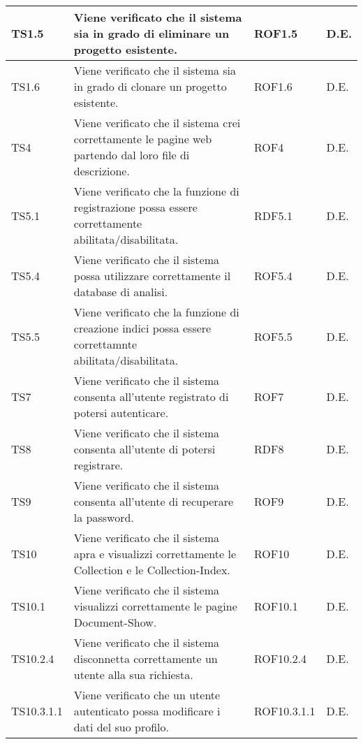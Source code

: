 \begin{center}
\begin{longtable}{|p{2cm}|p{7cm}|p{2cm}|p{2cm}|}
\midrule
TS1.5
& Viene verificato che il sistema sia in grado di eliminare un progetto esistente.
& ROF1.5
& D.E.\\


\midrule
TS1.6
& Viene verificato che il sistema sia in grado di clonare un progetto esistente.
& ROF1.6
& D.E.\\


\midrule
TS4
& Viene verificato che il sistema crei correttamente le pagine web partendo dal loro file di descrizione.
& ROF4
& D.E.\\


\midrule
TS5.1
& Viene verificato che la funzione di registrazione possa essere correttamente abilitata/disabilitata.
& RDF5.1
& D.E.\\


\midrule
TS5.4
& Viene verificato che il sistema possa utilizzare correttamente il database di analisi.
& ROF5.4
& D.E.\\


\midrule
TS5.5
& Viene verificato che la funzione di creazione indici possa essere correttamnte abilitata/disabilitata.
& ROF5.5
& D.E.\\


\midrule
TS7
& Viene verificato che il sistema consenta all'utente registrato di potersi autenticare.
& ROF7
& D.E.\\


\midrule
TS8
& Viene verificato che il sistema consenta all'utente di potersi registrare.
& RDF8
& D.E.\\


\midrule
TS9
& Viene verificato che il sistema consenta all'utente di recuperare la password.
& ROF9
& D.E.\\


\midrule
TS10
& Viene verificato che il sistema apra e visualizzi correttamente le Collection e le Collection-Index.
& ROF10
& D.E.\\


\midrule
TS10.1
& Viene verificato che il sistema visualizzi correttamente le pagine Document-Show.
& ROF10.1
& D.E.\\


\midrule
TS10.2.4
& Viene verificato che il sistema disconnetta correttamente un utente alla sua richiesta.
& ROF10.2.4
& D.E.\\


\midrule
TS10.3.1.1
& Viene verificato che un utente autenticato possa modificare i dati del suo profilo.
& ROF10.3.1.1
& D.E.\\



\end{longtable}
\end{center}
